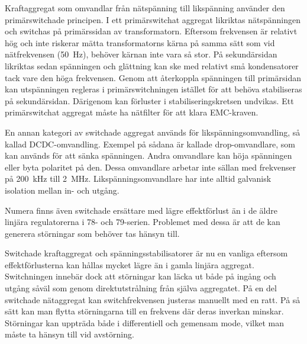 Kraftaggregat som omvandlar från nätspänning till likspänning använder
den primärswitchade principen.
I ett primärswitchat aggregat likriktas nätspänningen och switchas på
primärssidan av transformatorn.
Eftersom frekvensen är relativt hög och inte riskerar mätta transformatorns
kärna på samma sätt som vid nätfrekvensen (\SI{50}{\hertz}), behöver kärnan
inte vara så stor.
På sekundärsidan likriktas sedan spänningen och glättning kan ske med relativt
små kondensatorer tack vare den höga frekvensen.
Genom att återkoppla spänningen till primärsidan kan utspänningen regleras i
primärswitchningen istället för att behöva stabiliseras på
sekundärsidan. Därigenom kan förluster i stabiliseringskretsen undvikas.
Ett primärswitchat aggregat måste ha nätfilter för att klara EMC-kraven.

En annan kategori av switchade aggregat används för likspänningsomvandling, så kallad DCDC-om\-vand\-ling.
Exempel på sådana är kallade drop-omvandlare, som kan används för att sänka spänningen.
Andra omvandlare kan höja spänningen eller byta polaritet på den.
Dessa omvandlare arbetar inte sällan med frekvenser på \SI{200}{\kilo\hertz}
till \SI{2}{\mega\hertz}.
Likspänningsomvandlare har inte alltid galvanisk isolation mellan in- och utgång.

Numera finns även switchade ersättare med lägre effektförlust än i de äldre linjära regulatorerna i 78- och 79-serien.
Problemet med dessa är att de kan generera störningar som behöver tas hänsyn till.

Switchade kraftaggregat och spänningsstabilisatorer är nu en vanliga eftersom effektförlusterna kan hållas mycket lägre än i gamla linjära aggregat.
Switchningen innebär dock att störningar kan läcka ut både på ingång och utgång såväl som genom direktutstrålning från själva aggregatet.
På en del switchade nätaggregat kan switchfrekvensen justeras manuellt med en ratt. På så sätt kan man flytta störningarna till en frekvens där deras inverkan minskar.
Störningar kan uppträda både i differentiell och gemensam mode, vilket man måste ta hänsyn till vid avstörning.
